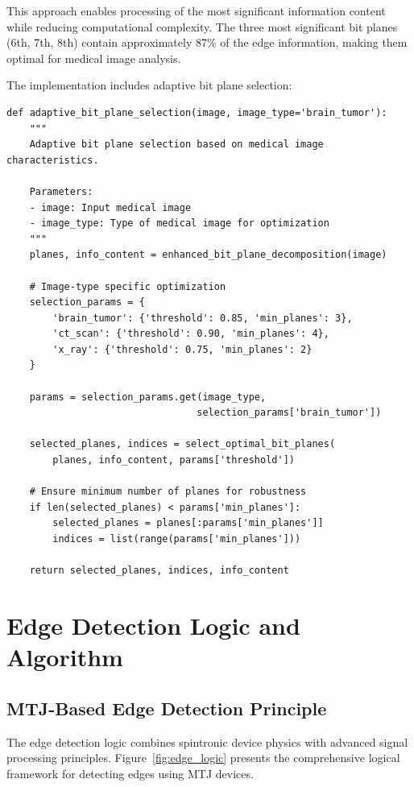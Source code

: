 \documentclass[conference]{IEEEtran}
\begin{document}
This approach enables processing of the most significant information content while reducing computational complexity. The three most significant bit planes (6th, 7th, 8th) contain approximately 87\% of the edge information, making them optimal for medical image analysis.

The implementation includes adaptive bit plane selection:

\begin{lstlisting}[caption={Adaptive bit plane selection for different image types}]
def adaptive_bit_plane_selection(image, image_type='brain_tumor'):
    """
    Adaptive bit plane selection based on medical image characteristics.
    
    Parameters:
    - image: Input medical image
    - image_type: Type of medical image for optimization
    """
    planes, info_content = enhanced_bit_plane_decomposition(image)
    
    # Image-type specific optimization
    selection_params = {
        'brain_tumor': {'threshold': 0.85, 'min_planes': 3},
        'ct_scan': {'threshold': 0.90, 'min_planes': 4},
        'x_ray': {'threshold': 0.75, 'min_planes': 2}
    }
    
    params = selection_params.get(image_type, 
                                 selection_params['brain_tumor'])
    
    selected_planes, indices = select_optimal_bit_planes(
        planes, info_content, params['threshold'])
    
    # Ensure minimum number of planes for robustness
    if len(selected_planes) < params['min_planes']:
        selected_planes = planes[:params['min_planes']]
        indices = list(range(params['min_planes']))
    
    return selected_planes, indices, info_content
\end{lstlisting}

\section{Edge Detection Logic and Algorithm}

\subsection{MTJ-Based Edge Detection Principle}

The edge detection logic combines spintronic device physics with advanced signal processing principles. Figure~\ref{fig:edge_logic} presents the comprehensive logical framework for detecting edges using MTJ devices.
\end{document}
